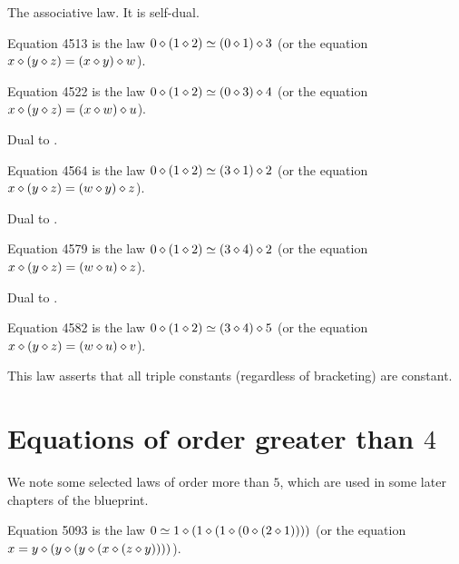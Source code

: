 The associative law. It is self-dual.

\begin{definition}[Equation 4513]\label{eq4513}\leanok{}  Equation 4513 is the law $0 \diamond (1 \diamond 2)  \simeq  (0 \diamond 1) \diamond 3$ (or the equation $x \diamond (y \diamond z) = (x \diamond y) \diamond w$).
\end{definition}

\begin{definition}[Equation 4522]\label{eq4522}\leanok{}  Equation 4522 is the law $0 \diamond (1 \diamond 2)  \simeq  (0 \diamond 3) \diamond 4$ (or the equation $x \diamond (y \diamond z) = (x \diamond w) \diamond u$).
\end{definition}

Dual to .

\begin{definition}[Equation 4564]\label{eq4564}\leanok{}  Equation 4564 is the law $0 \diamond (1 \diamond 2)  \simeq  (3 \diamond 1) \diamond 2$ (or the equation $x \diamond (y \diamond z) = (w \diamond y) \diamond z$).
\end{definition}

Dual to .

\begin{definition}[Equation 4579]\label{eq4579}\leanok{}  Equation 4579 is the law $0 \diamond (1 \diamond 2)  \simeq  (3 \diamond 4) \diamond 2$ (or the equation $x \diamond (y \diamond z) = (w \diamond u) \diamond z$).
\end{definition}

Dual to .

\begin{definition}[Equation 4582]\label{eq4582}\leanok{}  Equation 4582 is the law $0 \diamond (1 \diamond 2)  \simeq  (3 \diamond 4) \diamond 5$ (or the equation $x \diamond (y \diamond z) = (w \diamond u) \diamond v$).
\end{definition}

This law asserts that all triple constants (regardless of bracketing) are constant.

\section{Equations of order greater than \texorpdfstring{$4$}{4}}

We note some selected laws of order more than $5$, which are used in some later chapters of the blueprint.

\begin{definition}[Equation 5093]
  \label{eq5093}\leanok
  Equation 5093 is the law $0  \simeq 1 \diamond (1 \diamond (1 \diamond (0 \diamond (2 \diamond 1))))$ (or the equation $x = y \diamond (y \diamond (y \diamond (x \diamond (z \diamond y))))$).
\end{definition}

